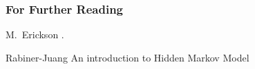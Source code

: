 \documentclass[compress]{beamer}
\begin{document}
\begin{frame}[allowframebreaks]
  \frametitle<presentation>{For Further Reading}
    
  \begin{thebibliography}{10}
    
  \beamertemplatebookbibitems

  \bibitem{}
    M.~Erickson
    .
 
    
  \beamertemplatearticlebibitems

  \bibitem{}
    Rabiner-Juang
    \newblock An introduction
to Hidden Markov Model
  \end{thebibliography}
\end{frame}
\end{document}
